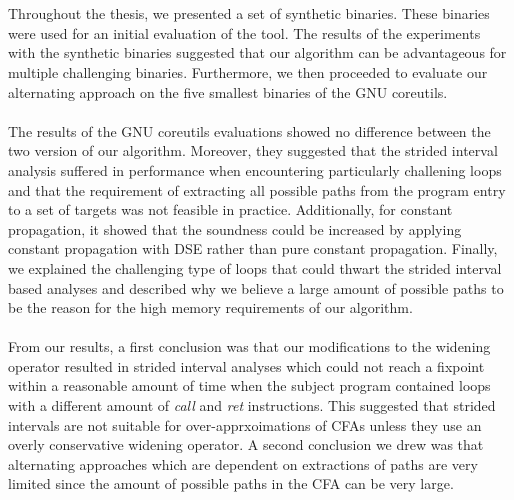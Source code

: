 \documentclass{kththesis}
\renewcommand{\it}[1]{\textit{#1}}
\begin{document}
\\ \\
Throughout the thesis, we presented a set of synthetic binaries. These binaries were used for an initial evaluation of the tool. The results of the experiments with the synthetic binaries suggested that our algorithm can be advantageous for multiple challenging binaries. Furthermore, we then proceeded to evaluate our alternating approach on the five smallest binaries of the GNU coreutils. 
\\ \\
The results of the GNU coreutils evaluations showed no difference between the two version of our algorithm. Moreover, they suggested that the strided interval analysis suffered in performance when encountering particularly challening loops and that the requirement of extracting all possible paths from the program entry to a set of targets was not feasible in practice. Additionally, for constant propagation, it showed that the soundness could be increased by applying constant propagation with DSE rather than pure constant propagation. Finally, we explained the challenging type of loops that could thwart the strided interval based analyses and described why we believe a large amount of possible paths to be the reason for the high memory requirements of our algorithm.
\\ \\
From our results, a first conclusion was that our modifications to the widening operator resulted in strided interval analyses which could not reach a fixpoint within a reasonable amount of time when the subject program contained loops with a different amount of \it{call} and \it{ret} instructions. This suggested that strided intervals are not suitable for over-apprxoimations of CFAs unless they use an overly conservative widening operator. A second conclusion we drew was that alternating approaches which are dependent on extractions of paths are very limited since the amount of possible paths in the CFA can be very large.

\end{document}
